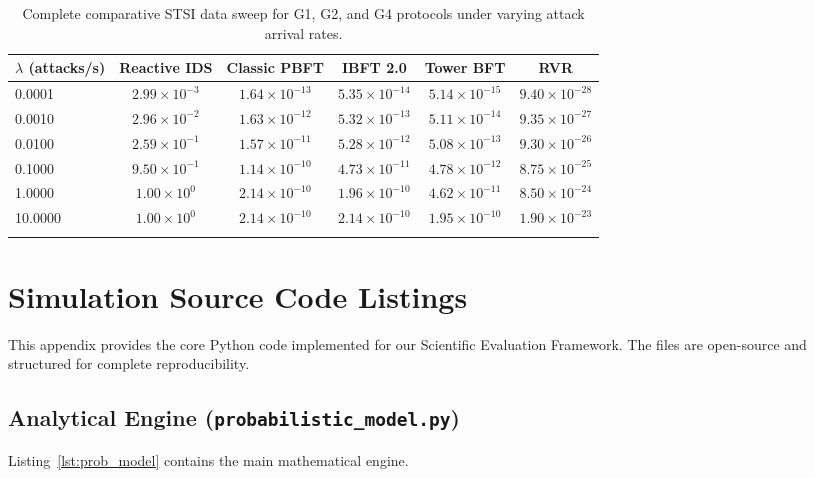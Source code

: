 \documentclass[12pt, oneside, a4paper]{report}
\theoremstyle{definition}
\theoremstyle{remark}
\begin{document}
\begin{longtable}{lccccc}
\toprule
$\lambda$ (attacks/s) & Reactive IDS & Classic PBFT & IBFT 2.0 & Tower BFT & RVR \\
\midrule
0.0001 & $2.99 \times 10^{-3}$ & $1.64 \times 10^{-13}$ & $5.35 \times 10^{-14}$ & $5.14 \times 10^{-15}$ & $9.40 \times 10^{-28}$ \\
0.0010 & $2.96 \times 10^{-2}$ & $1.63 \times 10^{-12}$ & $5.32 \times 10^{-13}$ & $5.11 \times 10^{-14}$ & $9.35 \times 10^{-27}$ \\
0.0100 & $2.59 \times 10^{-1}$ & $1.57 \times 10^{-11}$ & $5.28 \times 10^{-12}$ & $5.08 \times 10^{-13}$ & $9.30 \times 10^{-26}$ \\
0.1000 & $9.50 \times 10^{-1}$ & $1.14 \times 10^{-10}$ & $4.73 \times 10^{-11}$ & $4.78 \times 10^{-12}$ & $8.75 \times 10^{-25}$ \\
1.0000 & $1.00 \times 10^{0}$  & $2.14 \times 10^{-10}$ & $1.96 \times 10^{-10}$ & $4.62 \times 10^{-11}$ & $8.50 \times 10^{-24}$ \\
10.0000 & $1.00 \times 10^{0}$ & $2.14 \times 10^{-10}$ & $2.14 \times 10^{-10}$ & $1.95 \times 10^{-10}$ & $1.90 \times 10^{-23}$ \\
\bottomrule
\caption{Complete comparative STSI data sweep for G1, G2, and G4 protocols under varying attack arrival rates.}
\label{tab:app:stsi_complete}
\end{longtable}


\cleardoublepage


\chapter{Simulation Source Code Listings}
\label{app:code_listings}

This appendix provides the core Python code implemented for our Scientific Evaluation Framework. The files are open-source and structured for complete reproducibility.

\section{Analytical Engine (\texttt{probabilistic\_model.py})}
Listing~\ref{lst:prob_model} contains the main mathematical engine.
\end{document}
